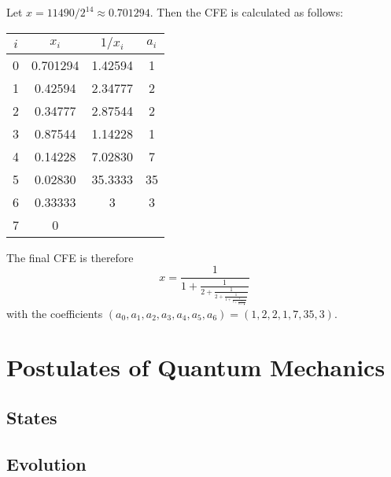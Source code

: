 		\begin{example}
			Let \( x = \num{11490} / 2^{14} \approx 0.701294 \). Then the \ac{CFE} is calculated as follows:
			\begin{center}
				\begin{tabular}{c|ccc}
					\toprule
					 \(i\)  &	\(x_i\)	 &  \(1 / x_i\)  & \(a_i\)  \\ \midrule
					\num{0} & \num{0.701294} & \num{1.42594} & \num{1}  \\ \bottomrule
					\num{1} & \num{0.42594}  & \num{2.34777} & \num{2}  \\ \bottomrule
					\num{2} & \num{0.34777}  & \num{2.87544} & \num{2}  \\ \bottomrule
					\num{3} & \num{0.87544}  & \num{1.14228} & \num{1}  \\ \bottomrule
					\num{4} & \num{0.14228}  & \num{7.02830} & \num{7}  \\ \bottomrule
					\num{5} & \num{0.02830}  & \num{35.3333} & \num{35} \\ \bottomrule
					\num{6} & \num{0.33333}  &	\num{3}	& \num{3}  \\ \bottomrule
					\num{7} &	\num{0}	 &			   &		  \\ \bottomrule
				\end{tabular}
			\end{center}
			The final \ac{CFE} is therefore
			\begin{equation}
				x = \frac{1}{1 + \frac{1}{2 + \frac{1}{2 + \frac{1}{1 + \frac{1}{7 + \frac{1}{35 + \frac{1}{3}}}}}}}
			\end{equation}
			with the coefficients \( (a_0, a_1, a_2, a_3, a_4, a_5, a_6) = (1, 2, 2, 1, 7, 35, 3) \).
		\end{example}

\chapter{Postulates of Quantum Mechanics}

	\section{States} %

	\section{Evolution} %

